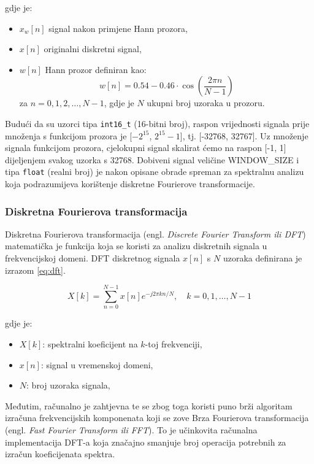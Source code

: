 gdje je:
\begin{itemize}
    \item \( x_w[n] \) signal nakon primjene Hann prozora,
    \item \( x[n] \) originalni diskretni signal,
    \item \( w[n] \) Hann prozor definiran kao:
    \begin{equation}
        w[n] = 0.54 - 0.46 \cdot \cos\left( \frac{2 \pi n}{N-1} \right)
    \end{equation}
    za \( n = 0, 1, 2, \dots, N-1 \),
    gdje je \( N \) ukupni broj uzoraka u prozoru.
\end{itemize}

Budući da su uzorci tipa \texttt{int16\_t} (16-bitni broj), raspon vrijednosti signala 
prije množenja s funkcijom prozora je [$-2^{15}$, $2^{15} - 1$], tj. [-32768, 32767]. Uz množenje
signala funkcijom prozora, cjelokupni signal skalirat ćemo na raspon [-1, 1] dijeljenjem svakog
uzorka s 32768. Dobiveni signal veličine WINDOW\_SIZE i tipa \texttt{float} (realni broj) je nakon
opisane obrade spreman za spektralnu analizu koja podrazumijeva korištenje diskretne Fourierove
transformacije.

\subsubsection{Diskretna Fourierova transformacija}
\label{sec:fft}

Diskretna Fourierova transformacija (engl. \textit{Discrete Fourier Transform ili DFT}) matematička je
funkcija koja se koristi za analizu diskretnih signala u frekvencijskoj domeni. 
DFT diskretnog signala \( x[n] \) s \( N \) uzoraka definirana je izrazom \ref{eq:dft}.

\begin{equation}
    X[k] = \sum_{n=0}^{N-1} x[n] e^{-j 2 \pi k n / N}, \quad k = 0, 1, \dots, N-1
    \label{eq:dft}
\end{equation}

gdje je:
\begin{itemize}
    \item \( X[k] \): spektralni koeficijent na \( k \)-toj frekvenciji,
    \item \( x[n] \): signal u vremenskoj domeni,
    \item \( N \): broj uzoraka signala,
\end{itemize}

Međutim, računalno je zahtjevna te se zbog toga koristi puno brži algoritam izračuna
frekvencijskih komponenata koji se zove Brza Fourierova transformacija (engl. \textit{Fast Fourier
Transform ili FFT}). To je učinkovita računalna implementacija DFT-a koja značajno smanjuje
broj operacija potrebnih za izračun koeficijenata spektra.

